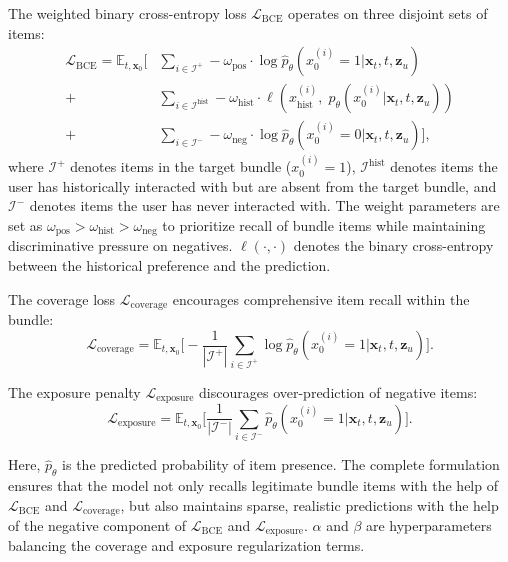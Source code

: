 \documentclass[lettersize,journal]{IEEEtran}
\begin{document}
The weighted binary cross-entropy loss $\mathcal{L}_{\mathrm{BCE}}$ operates on three disjoint sets of items:
\begin{equation}
    \begin{aligned}
    \mathcal{L}_{\mathrm{BCE}} = \mathbb{E}_{t, \mathbf{x}_0} \bigg[ &\sum_{i \in \mathcal{I}^+} - \omega_{\text{pos}} \cdot \log \hat{p}_\theta(x_{0}^{(i)}=1 | \mathbf{x}_t, t, \mathbf{z}_u) \\
    + &\sum_{i \in \mathcal{I}^{\text{hist}}} - \omega_{\text{hist}} \cdot \ell\left(x_{\text{hist}}^{(i)},\; \hat{p}_\theta(x_{0}^{(i)} | \mathbf{x}_t, t, \mathbf{z}_u)\right) \\
    + &\sum_{i \in \mathcal{I}^-} - \omega_{\text{neg}} \cdot \log \hat{p}_\theta(x_{0}^{(i)}=0 | \mathbf{x}_t, t, \mathbf{z}_u) \bigg],
    \end{aligned}
\end{equation}
where $\mathcal{I}^+$ denotes items in the target bundle ($x_0^{(i)}=1$), $\mathcal{I}^{\text{hist}}$ denotes items the user has historically interacted with but are absent from the target bundle, and $\mathcal{I}^-$ denotes items the user has never interacted with. The weight parameters are set as $\omega_{\text{pos}} > \omega_{\text{hist}} > \omega_{\text{neg}}$ to prioritize recall of bundle items while maintaining discriminative pressure on negatives. $\ell(\cdot,\cdot)$ denotes the binary cross-entropy between the historical preference and the prediction.

The coverage loss $\mathcal{L}_{\mathrm{coverage}}$ encourages comprehensive item recall within the bundle:
\begin{equation}
    \mathcal{L}_{\mathrm{coverage}} = \mathbb{E}_{t, \mathbf{x}_0} \bigg[ -\frac{1}{|\mathcal{I}^+|} \sum_{i \in \mathcal{I}^+} \log \hat{p}_\theta(x_{0}^{(i)}=1 | \mathbf{x}_t, t, \mathbf{z}_u) \bigg].
\end{equation}

The exposure penalty $\mathcal{L}_{\mathrm{exposure}}$ discourages over-prediction of negative items:
\begin{equation}
    \mathcal{L}_{\mathrm{exposure}} = \mathbb{E}_{t, \mathbf{x}_0} \bigg[ \frac{1}{|\mathcal{I}^-|} \sum_{i \in \mathcal{I}^-} \hat{p}_\theta(x_{0}^{(i)}=1 | \mathbf{x}_t, t, \mathbf{z}_u) \bigg].
\end{equation}

Here, $\hat{p}_\theta$ is the predicted probability of item presence. The complete formulation ensures that the model not only recalls legitimate bundle items with the help of $\mathcal{L}_{\mathrm{BCE}}$ and $\mathcal{L}_{\mathrm{coverage}}$, but also maintains sparse, realistic predictions with the help of the negative component of $\mathcal{L}_{\mathrm{BCE}}$ and $\mathcal{L}_{\mathrm{exposure}}$. $\alpha$ and $\beta$ are hyperparameters balancing the coverage and exposure regularization terms.
\end{document}
